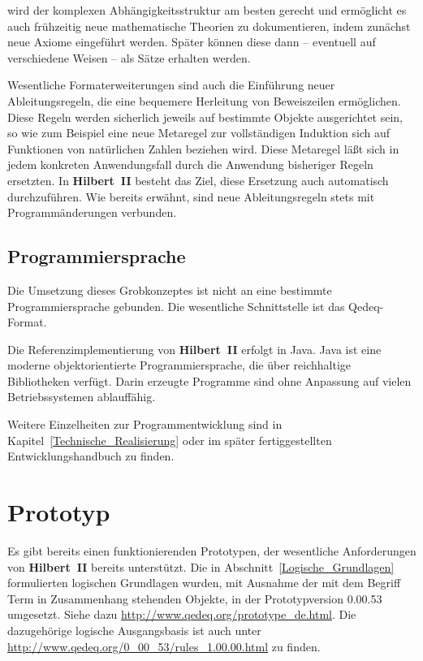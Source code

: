 \documentclass[a4paper,german,10pt,twoside]{book}
\begin{document}
{wird der komplexen Abh{\"a}ngigkeitsstruktur am besten gerecht und erm{\"o}glicht es auch fr{\"u}hzeitig neue
mathematische Theorien zu dokumentieren, indem zun{\"a}chst neue Axiome eingef{\"u}hrt werden. Sp{\"a}ter
k{\"o}nnen diese dann -- eventuell auf verschiedene Weisen -- als S{\"a}tze erhalten werden.
\par
Wesentliche Formaterweiterungen sind auch die Einf{\"u}hrung neuer Ableitungsregeln, die eine bequemere
Herleitung von Beweiszeilen erm{\"o}glichen. Diese Regeln werden sicherlich jeweils auf bestimmte
Objekte ausgerichtet sein, so wie zum Beispiel eine neue Metaregel zur vollst{\"a}ndigen Induktion sich
auf Funktionen von nat{\"u}rlichen Zahlen beziehen wird. Diese Metaregel l{\"a}{\ss}t sich in jedem konkreten
Anwendungsfall durch die Anwendung bisheriger Regeln ersetzten. In \textbf{Hilbert~II} besteht das
Ziel, diese Ersetzung auch automatisch durchzuf{\"u}hren. Wie bereits erw{\"a}hnt, sind neue
Ableitungsregeln stets mit Programm{\"a}nderungen verbunden.

\section{Programmiersprache}\label{Programmiersprache}
Die Umsetzung dieses Grobkonzeptes ist nicht an eine bestimmte Programmiersprache gebunden. Die
wesentliche Schnittstelle ist das Qedeq-Format.
\par
Die Referenzimplementierung von \textbf{Hilbert~II} erfolgt in Java. Java ist eine
moderne objektorientierte Programmiersprache, die {\"u}ber reichhaltige Bibliotheken verf{\"u}gt. Darin
erzeugte Programme sind ohne Anpassung auf vielen Betriebssystemen ablauff{\"a}hig.
\par
Weitere Einzelheiten zur Programmentwicklung sind in Kapitel~\ref{Technische_Realisierung} oder im
sp{\"a}ter fertiggestellten Entwicklungshandbuch zu finden.


\chapter{Prototyp} \label{Prototyp}
Es gibt bereits einen funktionierenden Prototypen, der wesentliche Anforderungen von
\textbf{Hilbert~II} bereits unterst{\"u}tzt. Die in Abschnitt~\ref{Logische_Grundlagen} formulierten
logischen Grundlagen wurden, mit Ausnahme der mit dem Begriff {\glqq Term\grqq} in Zusammenhang
stehenden Objekte, in der Prototypversion 0.00.53 umgesetzt. Siehe dazu
\url{http://www.qedeq.org/prototype_de.html}. Die dazugeh{\"o}rige logische Ausgangsbasis ist auch
unter \url{http://www.qedeq.org/0_00_53/rules_1.00.00.html} zu finden.

}
\end{document}
